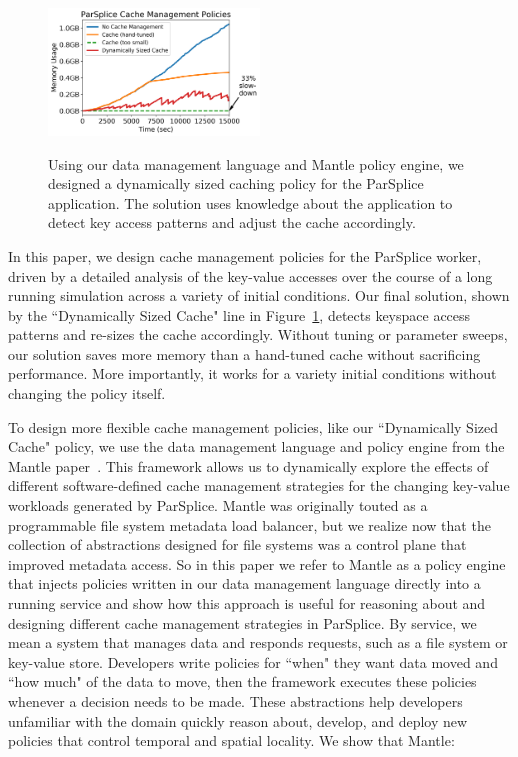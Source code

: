 \begin{figure}[t]
\noindent\includegraphics[width=0.5\textwidth]{figures/cache-management.png}\\

\caption{Using our data management language and Mantle policy engine, we
designed a dynamically sized caching policy for the ParSplice application. The
solution uses knowledge about the application to detect key access patterns and
adjust the cache accordingly. 
\label{fig:cache-management}}
\end{figure}

In this paper, we design cache management policies for the ParSplice worker,
driven by a detailed analysis of the key-value accesses over the course of a
long running simulation across a variety of initial conditions. Our final
solution, shown by the ``Dynamically Sized Cache" line in
Figure~\ref{fig:cache-management}, detects keyspace access patterns and
re-sizes the cache accordingly. Without tuning or parameter sweeps, our
solution saves more memory than a hand-tuned cache without sacrificing
performance.  More importantly, it works for a variety initial conditions
without changing the policy itself.

To design more flexible cache management policies, like our ``Dynamically
Sized Cache" policy, we use the data management language and policy engine
from the Mantle paper~\cite{sevilla:sc15-mantle}. This framework allows us to
dynamically explore the effects of different software-defined cache management
strategies for the changing key-value workloads generated by ParSplice.  Mantle
was originally touted as a programmable file system metadata load balancer, but
we realize now that the collection of abstractions designed for file systems
was a control plane that improved metadata access. So in this paper we refer to
Mantle as a policy engine that injects policies written in our data management
language directly into a running service and show how this approach is useful
for reasoning about and designing different cache management strategies in
ParSplice.  By service, we mean a system that manages data and responds
requests, such as a file system or key-value store.  Developers write policies
for ``when" they want data moved and ``how much" of the data to move, then the
framework executes these policies whenever a decision needs to be made.  These
abstractions help developers unfamiliar with the domain quickly reason about,
develop, and deploy new policies that control temporal and spatial locality. We
show that Mantle:

